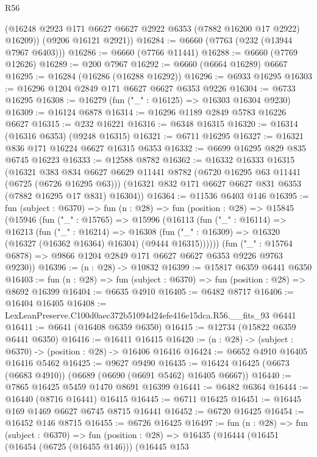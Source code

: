 \begin{lexlean}{R56}
\begin{coremodule}
        (@16248 @2923 @171 @6627 @6627 @2922 @6353 (@7882 @16200 @17 @2922) @16209))
      (@9206 @16121 @2921))
@16284 := @6660 (@7763 (@232 (@13944 @7967 @6403)))
@16286 := @6660 (@7766 @11441)
@16288 := @6660 (@7769 @12626)
@16289 := @200 @7967
@16292 := @6660 (@6664 @16289) @6667
@16295 := @16284 (@16286 (@16288 @16292))
@16296 := @6933 @16295
@16303 := @16296 @1204 @2849 @171 @6627 @6627 @6353 @9226
@16304 := @6733 @16295
@16308 := @16279 (fun ("_" : @16125) => @16303 @16304 @9230)
@16309 := @16124 @6878
@16314 := @16296 @1189 @2849 @5783 @16226 @6627
@16315 := @232 @16221
@16316 := @6348 @16315
@16320 := @16314 (@16316 @6353) (@9248 @16315)
@16321 := @6711 @16295
@16327 := @16321 @836 @171 @16224 @6627 @16315 @6353
@16332 := @6699 @16295 @829 @835 @6745 @16223
@16333 := @12588 @8782
@16362 := @16332
    @16333
    @16315
    (@16321
      @383
      @834
      @6627
      @6629
      @11441
      @8782
      (@6720 @16295 @63 @11441 (@6725 (@6726 @16295 @63)))
      (@16321 @832 @171 @6627 @6627 @831 @6353 (@7882 @16295 @17 @831) @16304))
@16364 := @11536 @6403 @146
@16395 := fun (subject : @6370) =>
  fun (n : @28) =>
  fun (position : @28) =>
  @15845
    (@15946
      (fun ("_" : @15765) =>
      @15996
        (@16113
          (fun ("_" : @16114) =>
          @16213
            (fun ("_" : @16214) =>
            @16308 (fun ("_" : @16309) => @16320 (@16327 (@16362 @16364) @16304) (@9444 @16315))))))
      (fun ("_" : @15764 @6878) => @9866 @1204 @2849 @171 @6627 @6627 @6353 @9226 @9763 @9230))
@16396 := (n : @28) -> @10832
@16399 := @15817 @6359 @6441 @6350
@16403 := fun (n : @28) => fun (subject : @6370) => fun (position : @28) => @8692 @16399
@16404 := @6635 @4910
@16405 := @6482 @8717
@16406 := @16404 @16405
@16408 := LexLeanPreserve.C100d0aec372b51094d24efe416e15dca.R56.__fits_93 @6441
@16411 := @6641 (@16408 @6359 @6350)
@16415 := @12734 (@15822 @6359 @6441 @6350)
@16416 := @16411 @16415
@16420 := (n : @28) -> (subject : @6370) -> (position : @28) -> @16406 @16416
@16424 := @6652 @4910 @16405 @16416 @5462
@16425 := @9627 @9490
@16435 := @16424 @16425 (@6673 (@6683 @4910)) (@6689 (@6690 (@6691 @5462) @16405 @6667))
@16440 := @7865 @16425 @5459 @1470 @8691 @16399
@16441 := @6482 @6364
@16444 := @16440 (@8716 @16441) @16415
@16445 := @6711 @16425
@16451 := @16445 @169 @1469 @6627 @6745 @8715 @16441
@16452 := @6720 @16425
@16454 := @16452 @146 @8715
@16455 := @6726 @16425
@16497 := fun (n : @28) =>
  fun (subject : @6370) =>
  fun (position : @28) =>
  @16435
    (@16444
      (@16451
        (@16454 (@6725 (@16455 @146)))
        (@16445
          @153

\end{coremodule}
\end{lexlean}

